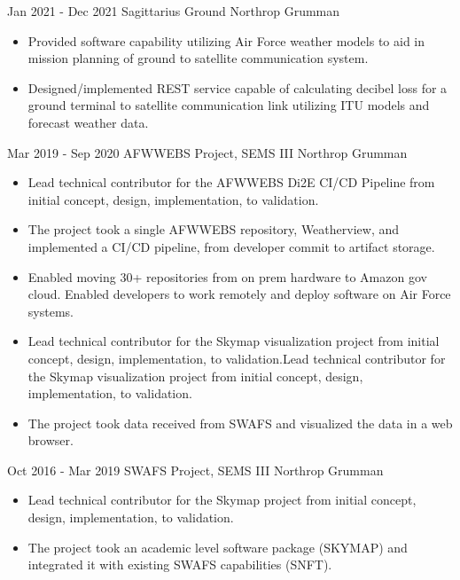 \documentclass[]{src/friggeri-cv}
\begin{document}
\begin{entrylist}
  \entry
    {Jan 2021 - Dec 2021}
    {Sagittarius Ground}
    {Northrop Grumman}
    {\begin{itemize}
        \item Provided software capability utilizing Air Force weather models to aid in mission planning of ground to satellite communication system.
        \item Designed/implemented REST service capable of calculating decibel loss for a ground terminal to satellite communication link utilizing ITU models and forecast weather data.
    \end{itemize}}
  \entry
    {Mar 2019 - Sep 2020}
    {AFWWEBS Project, SEMS III}
    {Northrop Grumman}
    {\begin{itemize}
        \item Lead technical contributor for the AFWWEBS Di2E CI/CD Pipeline from initial concept, design, implementation, to validation.
        \item The project took a single AFWWEBS repository, Weatherview, and implemented a CI/CD pipeline, from developer commit to artifact storage.
        \item Enabled moving 30+ repositories from on prem hardware to Amazon gov cloud. Enabled developers to work remotely and deploy software on Air Force systems.
        \item Lead technical contributor for the Skymap visualization project from initial concept, design, implementation, to validation.Lead technical contributor for the Skymap visualization project from initial concept, design, implementation, to validation.
        \item The project took data received from SWAFS and visualized the data in a web browser.
    \end{itemize}}
  \entry
    {Oct 2016 - Mar 2019}
    {SWAFS Project, SEMS III}
    {Northrop Grumman}
    {\begin{itemize}
        \item Lead technical contributor for the Skymap project from initial concept, design, implementation, to validation.
        \item The project took an academic level software package (SKYMAP) and integrated it with existing SWAFS capabilities (SNFT).
    \end{itemize}}
\end{entrylist}
\end{document}
